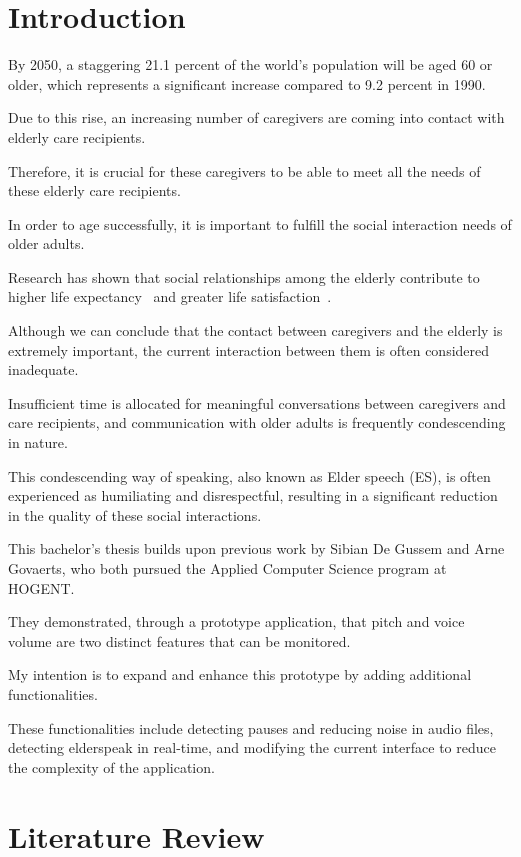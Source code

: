 \documentclass[english]{hogent-article}
\begin{document}
\section{Introduction}%
\label{sec:Introduction}

By 2050, a staggering 21.1 percent of the world's population will be aged 60 or older, which represents a significant increase compared to 9.2 percent in 1990.

Due to this rise, an increasing number of caregivers are coming into contact with elderly care recipients.

Therefore, it is crucial for these caregivers to be able to meet all the needs of these elderly care recipients.

In order to age successfully, it is important to fulfill the social interaction needs of older adults.

Research has shown that social relationships among the elderly contribute to higher life expectancy~\autocite{Rodriguez-Laso2007} and greater life satisfaction~\autocite{Okamoto2008-eh}.

Although we can conclude that the contact between caregivers and the elderly is extremely important, the current interaction between them is often considered inadequate.

Insufficient time is allocated for meaningful conversations between caregivers and care recipients, and communication with older adults is frequently condescending in nature.

This condescending way of speaking, also known as Elder speech (ES), is often experienced as humiliating and disrespectful, resulting in a significant reduction in the quality of these social interactions.

This bachelor's thesis builds upon previous work by Sibian De Gussem and Arne Govaerts, who both pursued the Applied Computer Science program at HOGENT.

They demonstrated, through a prototype application, that pitch and voice volume are two distinct features that can be monitored.

My intention is to expand and enhance this prototype by adding additional functionalities.

These functionalities include detecting pauses and reducing noise in audio files, detecting elderspeak in real-time, and modifying the current interface to reduce the complexity of the application.

\section{Literature Review}%
\label{sec:literature review}
\end{document}
